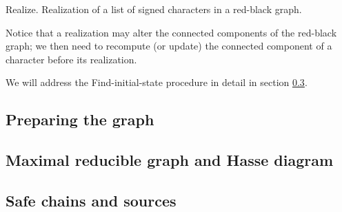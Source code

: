 \pagebreak %

\begin{algorithm}[h]\label{algorithm:realize}
  \caption{Realize. Realization of a list of signed characters in a red-black graph.}



  \BlankLine


  \BlankLine

  \Return \grb{}\;
\end{algorithm}

Notice that a realization may alter the connected components of the red-black graph; we then need to recompute (or update) the connected component of a character \character[][\pm] before its realization.

We will address the Find-initial-state procedure in detail in section \ref{section:safe-chains-sources}.

\subsection{Preparing the graph}\label{section:preparing-the-graph}

\subsection{Maximal reducible graph and Hasse diagram}\label{section:gm-hassediagram}

\subsection{Safe chains and sources}\label{section:safe-chains-sources}
